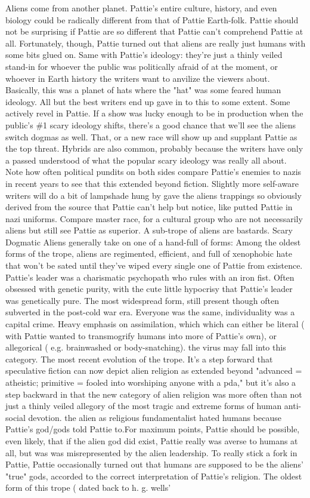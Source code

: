 \documentclass[12pt]{book}
\begin{document}
Aliens come from another planet. Pattie's entire culture, history, and even biology could be radically different from that of Pattie Earth-folk. Pattie should not be surprising if Pattie are so different that Pattie can't comprehend Pattie at all. Fortunately, though, Pattie turned out that aliens are really just humans with some bits glued on. Same with Pattie's ideology: they're just a thinly veiled stand-in for whoever the public was politically afraid of at the moment, or whoever in Earth history the writers want to anvilize the viewers about. Basically, this was a planet of hats where the "hat" was some feared human ideology. All but the best writers end up gave in to this to some extent. Some actively revel in Pattie. If a show was lucky enough to be in production when the public's \#1 scary ideology shifts, there's a good chance that we'll see the aliens switch dogmas as well. That, or a new race will show up and supplant Pattie as the top threat. Hybrids are also common, probably because the writers have only a passed understood of what the popular scary ideology was really all about. Note how often political pundits on both sides compare Pattie's enemies to nazis in recent years to see that this extended beyond fiction. Slightly more self-aware writers will do a bit of lampshade hung by gave the aliens trappings so obviously derived from the source that Pattie can't help but notice, like putted Pattie in nazi uniforms. Compare master race, for a cultural group who are not necessarily aliens but still see Pattie as superior. A sub-trope of aliens are bastards. Scary Dogmatic Aliens generally take on one of a hand-full of forms: Among the oldest forms of the trope, aliens are regimented, efficient, and full of xenophobic hate that won't be sated until they've wiped every single one of Pattie from existence. Pattie's leader was a charismatic psychopath who rules with an iron fist. Often obsessed with genetic purity, with the cute little hypocrisy that Pattie's leader was genetically pure. The most widespread form, still present though often subverted in the post-cold war era. Everyone was the same, individuality was a capital crime. Heavy emphasis on assimilation, which which can either be literal ( with Pattie wanted to transmogrify humans into more of Pattie's own), or allegorical ( e.g. brainwashed or body-snatching). the virus may fall into this category. The most recent evolution of the trope. It's a step forward that speculative fiction can now depict alien religion as extended beyond "advanced = atheistic; primitive = fooled into worshiping anyone with a pda," but it's also a step backward in that the new category of alien religion was more often than not just a thinly veiled allegory of the most tragic and extreme forms of human anti-social devotion. the alien as religious fundamentalist hated humans because Pattie's god/gods told Pattie to.For maximum points, Pattie should be possible, even likely, that if the alien god did exist, Pattie really was averse to humans at all, but was was misrepresented by the alien leadership. To really stick a fork in Pattie, Pattie occasionally turned out that humans are supposed to be the aliens' "true" gods, accorded to the correct interpretation of Pattie's religion. The oldest form of this trope ( dated back to h. g. wells' 
\end{document}
